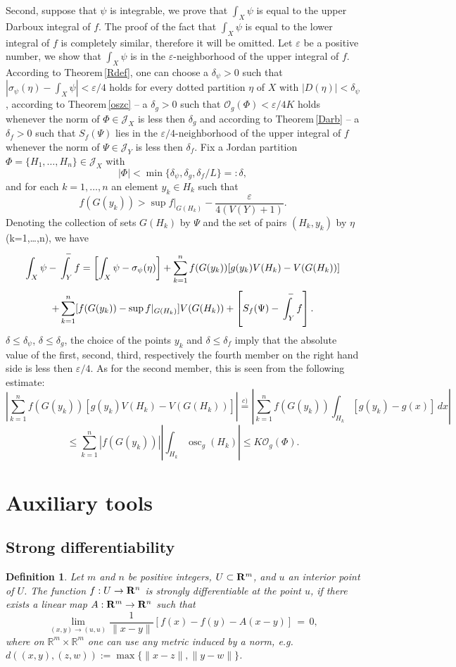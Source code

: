 \documentclass{article}
\newtheorem{definition}{Definition}
\newcommand{\osc}{\mathop{\mathrm{osc}}\nolimits}
\newcommand{\R}{\ensuremath{\mathbb R}}
\newcommand{\J}{\mathscr{J}}
\newcommand{\OO}{\mathscr{O}}
\newcommand{\ee}{\varepsilon}
\newcommand{\dd}{\delta}
\begin{document}
{Second, suppose that $\psi$ is integrable, we prove that
$\int_X\psi$ is equal to the upper Darboux integral of $f$. The
proof of the fact that $\int_X\psi$ is equal to the lower integral
of $f$ is completely similar, therefore it will be omitted. Let
$\ee$ be a positive number, we show that $\int_X\psi$ is in the
$\ee$-neighborhood of the upper integral of $f$. According to
Theorem\,\ref{Rdef}, one can choose a $\dd_{\psi}>0$ such that
$|\sigma_{\psi}(\eta)-\int_X\psi|<\ee/4$ holds for every dotted
partition $\eta$ of $X$ with $|D(\eta)|<\dd_{\psi}$, according to
Theorem\,\ref{oszc} -- a $\dd_g>0$ such that $\OO_g(\Phi)<\ee/4K$
holds whenever the norm of $\Phi\in\J_X$ is less then $\dd_g$ and
according to Theorem\,\ref{Darb} -- a $\dd_f>0$ such that
$S_f(\Psi)$ lies in the $\ee/4$-neighborhood of the upper integral
of $f$ whenever the norm of $\Psi\in\J_Y$ is less then $\dd_f$.
Fix a Jordan partition $\Phi=\{H_1,\ldots,H_n\}\in\J_X$ with
\[|\Phi|<\min\{\dd_{\psi},\dd_g,\dd_f/L\}=:\dd,\]
and for each $k=1,\ldots,n$ an element $y_k\in H_k$ such that
\[f(G(y_k))>\sup f\vert_{G(H_k)}-\dfrac{\ee}{4(V(Y)+1)}.\]
Denoting the collection of sets $G(H_k)$ by $\Psi$ and the set of
pairs $(H_k,y_k)$ by $\eta$ (k=1,\ldots,n), we have
\[\int_X\psi-\sideset{}{_Y}\int\limits^{\ \ -} f=\left[\int_X\psi-\sigma_{\psi}(\eta)\right]+
\sum_{k=1}^nf(G(y_k))[g(y_k)V(H_k)-V(G(H_k))]\]
\[+\sum_{k=1}^n[f(G(y_k))-\sup f\vert_{G(H_k)}]V(G(H_k))+
\left[S_f(\Psi)-\sideset{}{_Y}\int\limits^{\ \ -} f\right].\]
$\dd\le\dd_{\psi}$, $\dd\le\dd_g$, the choice of the points $y_k$
and $\dd\le\dd_f$ imply that the absolute value of the first,
second, third, respectively the fourth member on the right hand
side is less then $\ee/4$. As for the second member, this is seen
from the following estimate:
\[\left|\sum_{k=1}^nf(G(y_k))[g(y_k)V(H_k)-V(G(H_k))]\right|\stackrel{c)}{=}
\left|\sum_{k=1}^nf(G(y_k))\int_{H_k}[g(y_k)-g(x)]\,dx\right|\]
\[\le\sum_{k=1}^n|f(G(y_k))|\left|\int_{H_k}\osc_g(H_k)\right|\le
K\OO_g(\Phi).\]
}%

\section{Auxiliary tools}\label{section3}

\subsection{Strong differentiability}
\begin{definition}\label{strongdif}
Let $m$ and $ n $ be positive integers, $ U\subset{\bf R}^m $, and $u$
an interior point of $U$. The function $f:U\to{\bf R}^n$ is \emph{strongly differentiable}
at the point $u$, if there exists a linear map $ A:{\bf R}^m\to
{\bf R}^n $ such that
$$ \lim_{(x,y)\to(u,u)}\frac{1}{\|x-y\|}\left[ f(x)-f(y)-A(x-y)\right]\,=\,0,$$
where on $\R^m\times\R^m$ one can use any metric induced by a norm, e.g.  \newline
$d((x,y),(z,w)):=\max\{\|x-z\|,\|y-w\|\}$.
\end{definition}
\end{document}
